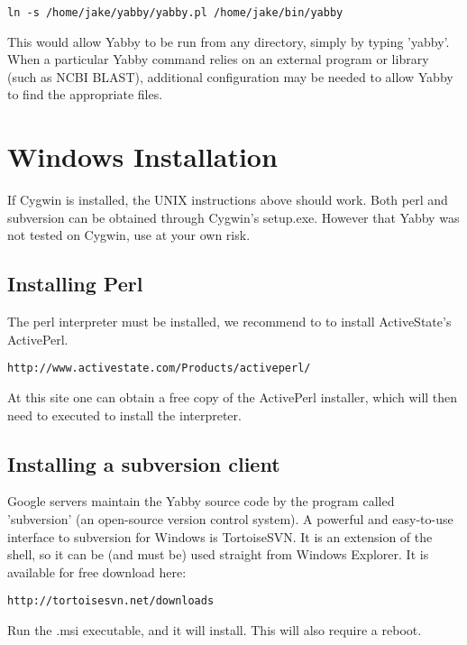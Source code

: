 \begin{verbatim}
ln -s /home/jake/yabby/yabby.pl /home/jake/bin/yabby
\end{verbatim}

This would allow Yabby to be run from any directory, simply by
typing 'yabby'. When a particular Yabby command relies on an 
external program or library (such as NCBI BLAST), additional
configuration may be needed to allow Yabby to find the appropriate
files.

\section{Windows Installation}

If Cygwin is installed, the UNIX instructions above should work. Both
perl and subversion can be obtained through Cygwin's setup.exe. However 
that Yabby was not tested on Cygwin, use at your own risk.

\subsection{Installing Perl}

The perl interpreter must be installed, we recommend to to install
ActiveState's ActivePerl.

\begin{verbatim}
http://www.activestate.com/Products/activeperl/
\end{verbatim}

At this site one can obtain a free copy of the ActivePerl installer, which
will then need to executed to install the interpreter.

\subsection{Installing a subversion client}

Google servers maintain the Yabby source code by the program called
'subversion' (an open-source version control system).  A powerful and
easy-to-use interface to subversion for Windows is TortoiseSVN. It is
an extension of the shell, so it can be (and must be) used straight
from Windows Explorer. It is available for free download here:

\begin{verbatim}
http://tortoisesvn.net/downloads
\end{verbatim}

Run the .msi executable, and it will install. This will also require
a reboot.

